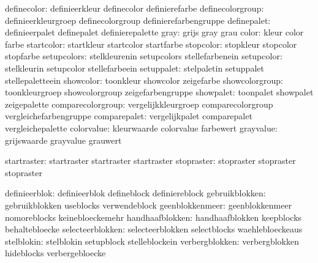                   definecolor:  definieerkleur               definecolor
                                definierefarbe
             definecolorgroup:  definieerkleurgroep          definecolorgroup
                                definierefarbengruppe
                  definepalet:  definieerpalet               definepalet
                                definierepalette
                         gray:  grijs                        gray
                                grau
                        color:  kleur                        color
                                farbe
                   startcolor:  startkleur                   startcolor
                                startfarbe
                    stopcolor:  stopkleur                    stopcolor
                                stopfarbe
                  setupcolors:  stelkleurenin                setupcolors
                                stellefarbenein
                   setupcolor:  stelkleurin                  setupcolor
                                stellefarbeein
                   setuppalet:  stelpaletin                  setuppalet
                                stellepaletteein
                    showcolor:  toonkleur                    showcolor
                                zeigefarbe
               showcolorgroup:  toonkleurgroep               showcolorgroup
                                zeigefarbengruppe
                    showpalet:  toonpalet                    showpalet
                                zeigepalette
            comparecolorgroup:  vergelijkkleurgroep          comparecolorgroup
                                vergleichefarbengruppe
                 comparepalet:  vergelijkpalet               comparepalet
                                vergleichepalette
                   colorvalue:  kleurwaarde                  colorvalue
                                farbewert
                    grayvalue:  grijswaarde                  grayvalue
                                grauwert

                  startraster:  startraster                  startraster
                                startraster
                   stopraster:  stopraster                   stopraster
                                stopraster

                definieerblok:  definieerblok                defineblock
                                definiereblock
               gebruikblokken:  gebruikblokken               useblocks
                                verwendeblock
              geenblokkenmeer:  geenblokkenmeer              nomoreblocks
                                keinebloeckemehr
              handhaafblokken:  handhaafblokken              keepblocks
                                behaltebloecke
             selecteerblokken:  selecteerblokken             selectblocks
                                waehlebloeckeaus
                   stelblokin:  stelblokin                   setupblock
                                stelleblockein
               verbergblokken:  verbergblokken               hideblocks
                                verbergebloecke

